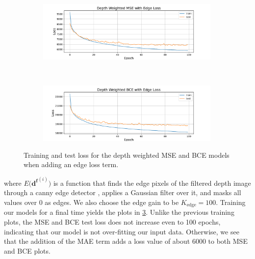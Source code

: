 \begin{figure}[htb]
    \centering
    \begin{subfigure}[b]{\textwidth}
        \centering
        \captionsetup{justification=centering}
        \includegraphics[width=0.99\textwidth]{figures/8_/3_final_MSE_depth_weighted10_with_depth_weighted_canny_edge_mae100_loss.pdf}
        \label{fig:3_final_MSE_depth_weighted10_with_depth_weighted_canny_edge_mae100_loss}
    \end{subfigure} \\
    \begin{subfigure}[b]{\textwidth}
        \centering
        \captionsetup{justification=centering}
        \includegraphics[width=0.99\textwidth]{figures/8_/6_final_BCE_depth_weighted10_with_depth_weighted_canny_edge_mae100_loss.pdf}
        \label{fig:6_final_BCE_depth_weighted10_with_depth_weighted_canny_edge_mae100_loss}
    \end{subfigure} 
    \caption{Training and test loss for the depth weighted MSE and BCE models when adding an edge loss term.}
    \label{fig:8_edge_depth_weighted_vae}
\end{figure}
where $E\Big(\boldsymbol{d^f}^{(i)}\Big)$ is a function that finds the edge pixels of the filtered depth image through a canny edge detector \cite{canny_edge_detection}, applies a Gaussian filter over it, and masks all values over 0 as edges. We also choose the edge gain to be $K_\text{edge} = 100$. Training our models for a final time yields the plots in \cref{fig:8_edge_depth_weighted_vae}.
Unlike the previous training plots, the MSE and BCE test loss does not increase even to 100 epochs, indicating that our model is not over-fitting our input data. Otherwise, we see that the addition of the MAE term adds a loss value of about 6000 to both MSE and BCE plots. 

